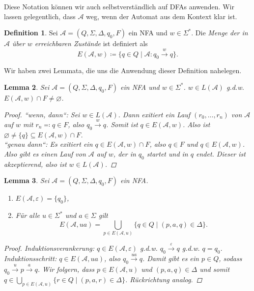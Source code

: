 \documentclass[11pt, a4paper]{article}
\theoremstyle{definition}
\newtheorem{definition}{Definition}[section]
\theoremstyle{plain}
\newtheorem{lemma}[definition]{Lemma}
\numberwithin{equation}{section}
\newcommand{\reaches}[1]{\overset{#1}{\rightarrow}}
\let\emptyset\varnothing
\begin{document}
Diese Notation können wir auch selbstverständlich auf DFAs anwenden. Wir lassen gelegentlich, dass $\mathcal{A}$ weg, wenn der Automat aus dem Kontext klar ist.
\begin{definition}
	Sei $\mathcal{A} = (Q, \Sigma, \Delta, q_0, F)$ ein NFA und $w \in \Sigma^\ast$. Die \textit{Menge der in $\mathcal{A}$ über $w$ erreichbaren Zustände} ist definiert als
	$$
		E(\mathcal{A}, w) \coloneqq \{ q \in Q \mid \mathcal{A}: q_0 \reaches{w} q \}.
	$$
\end{definition}
Wir haben zwei Lemmata, die uns die Anwendung dieser Definition nahelegen.
\begin{lemma}\label{lem:reach1}
	Sei $\mathcal{A} = (Q, \Sigma, \Delta, q_0, F)$ ein NFA und $w \in \Sigma^\ast$. $w \in L(\mathcal{A})$ {g.d.w.} $E(\mathcal{A}, w) \cap F \neq \emptyset$.
	\begin{proof}
		``wenn, dann``: Sei $w \in L(\mathcal{A})$. Dann exitiert ein Lauf $(r_0, \ldots, r_n)$ von $\mathcal{A}$ auf $w$ mit $r_n \eqqcolon q \in F$, also $q_0 \reaches{w} q$. Somit ist $q \in E(\mathcal{A}, w)$. Also ist $\emptyset \neq \{q\} \subseteq E(\mathcal{A}, w) \cap F$.\\
		``genau dann``: Es exitiert ein $q \in E(\mathcal{A}, w) \cap F$, also $q \in F$ und $q \in E(\mathcal{A}, w)$. Also gibt es einen Lauf von $\mathcal{A}$ auf $w$, der in $q_0$ startet und in $q$ endet. Dieser ist akzeptierend, also ist $w \in L(\mathcal{A})$.
	\end{proof}
\end{lemma}
\begin{lemma}\label{lem:reach2}
	Sei $\mathcal{A} = (Q, \Sigma, \Delta, q_0, F)$ ein NFA.
	\begin{enumerate}
		\item $E(\mathcal{A}, \varepsilon) = \{q_0\}$,
		\item Für alle $u \in \Sigma^\ast$ und $a \in \Sigma$ gilt
			$$
				E(\mathcal{A}, ua) = \bigcup_{p \in E(\mathcal{A}, u)} \{ q \in Q \mid (p, a, q) \in \Delta \}.
			$$
	\end{enumerate}
	\begin{proof}
		Induktionsverankerung: $q \in E(\mathcal{A}, \varepsilon)$ {g.d.w.} $q_0 \reaches{\varepsilon} q$ {g.d.w.} $q = q_0$. \checkmark\\
		Induktionsschritt: $q \in E(\mathcal{A}, ua)$, also $q_0 \reaches{ua} q$. Damit gibt es ein $p \in Q$, sodass $q_0 \reaches{u} p \reaches{a} q$. Wir folgern, dass $p \in E(\mathcal{A}, u)$ und $(p, a, q) \in \Delta$ und somit $q \in \bigcup_{p \in E(\mathcal{A}, u)} \{ r \in Q \mid (p, a, r) \in \Delta \}$. Rückrichtung analog.
	\end{proof}
\end{lemma}
\end{document}
